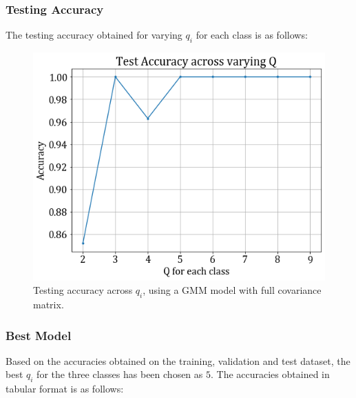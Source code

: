 \documentclass[11pt,a4paper]{article}
\begin{document}
\subsubsection{Testing Accuracy}
The testing accuracy obtained for varying $q_i$ for each class is as follows:
\begin{figure}[H]
    \centering
    \includegraphics[scale=0.45]{images/1b_full_test.png}
    \caption{Testing accuracy across $q_i$, using a GMM model with full covariance matrix.}
\end{figure}

\subsubsection{Best Model}
Based on the accuracies obtained on the training, validation and test dataset, the best $q_i$ for the three classes has been chosen as $5$. The accuracies obtained in tabular format is as follows:

\end{document}
